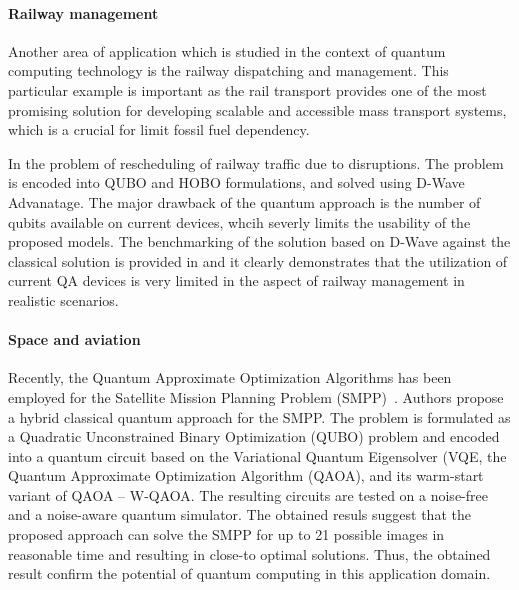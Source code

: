 \documentclass[a4paper,11pt]{article}
\begin{document}
 
\paragraph{Railway management}

Another area of application which is studied in the context of quantum computing technology is the railway dispatching and management. This particular example is important as the rail transport provides one of the most promising solution for developing scalable and accessible mass transport systems, which is a crucial for limit fossil fuel dependency.


In \cite{domino2022quadratic} the problem of rescheduling of railway traffic due to disruptions. The problem is encoded into QUBO and HOBO formulations, and solved using D-Wave Advanatage. The major drawback of the quantum approach is the number of qubits available on current devices, whcih severly limits the usability of the proposed models. The benchmarking of the solution based on D-Wave against the classical solution is provided in \cite{domino2023quantum} and it clearly demonstrates that the utilization of current QA devices is very limited in the aspect of railway management in realistic scenarios. 


\paragraph{Space and aviation}

Recently, the Quantum Approximate Optimization Algorithms has been employed for the Satellite Mission Planning Problem (SMPP)~\cite{quetschlich2023satellite}. Authors propose a hybrid classical quantum approach for the SMPP. The problem is formulated as a Quadratic Unconstrained Binary Optimization (QUBO) problem and encoded into a quantum circuit based on the Variational Quantum Eigensolver (VQE, the Quantum Approximate Optimization Algorithm (QAOA), and its warm-start variant of QAOA -- W-QAOA. The resulting circuits are tested on a noise-free and a noise-aware quantum simulator. The obtained resuls suggest that the proposed approach can solve the SMPP for up to 21 possible images in reasonable time and resulting in close-to optimal solutions. Thus, the obtained result confirm the potential of quantum computing in this application domain.
\end{document}

